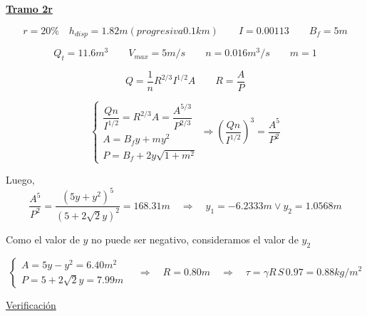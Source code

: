\underline{\bf Tramo 2r}


\begin{equation*}
  r = 20\%
  \quad
  h_{disp} = 1.82 m (progresiva 0.1 km)
 \qquad
  I = 0.00113
 \qquad
  B_{f} = 5 m
\end{equation*}

\begin{equation*}
  Q_{t} = 11.6 m^{3}
 \qquad
  V_{max} = 5 m/s
 \qquad
  n = 0.016 m^3/s
 \qquad
  m = 1
\end{equation*}

\begin{equation*}
 Q = \frac{1}{n} R^{2/3} I^{1/2} A
 \qquad
 R = \frac{A}{P}
\end{equation*}

\begin{equation*}
  \begin{cases}
    \dfrac{Q n}{I^{1/2}} = R^{2/3} A = \dfrac{A^{5/3}}{P^{2/3}} \\
    A = B_{f}y + m y^{2} \\
    P = B_{f} + 2 y \sqrt{1 + m^{2}}
  \end{cases}
  \Longrightarrow
  (\dfrac{Q n}{I^{1/2}})^{3} = \dfrac{A^{5}}{P^{2}}
\end{equation*}

Luego,
\begin{equation*}
  \dfrac{A^{5}}{P^{2}} = \dfrac{(5 y + y^{2})^{5}}{(5 + 2 \sqrt{2} y)^{2}} = 168.31 m
  \quad
  \Longrightarrow
  \quad
  y_{1} = -6.2333 m \vee y_{2} = 1.0568 m
\end{equation*}


Como el valor de $y$ no puede ser negativo, consideramos el valor de $y_{2}$

\begin{equation*}
  \begin{cases}
    A = 5 y - y^{2} = 6.40 m^{2} \\
    P = 5 + 2 \sqrt{2} y = 7.99 m
  \end{cases}
  \quad
  \Longrightarrow
  \quad
  R = 0.80 m
  \quad
  \Longrightarrow
  \quad
  \tau = \gamma R \, S \, 0.97 = 0.88 kg/m^{2}
\end{equation*}


\underline{Verificación}


